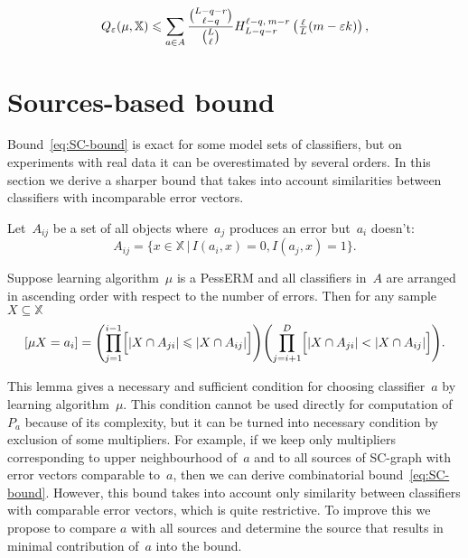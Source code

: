 \documentclass{article}
\def\AA{A}
\def\XX{\mathbb{X}}
\renewcommand{\leq}{\leqslant}
\def\CC_#1^#2{\tbinom{#1}{#2}}
\newcommand{\hypergeom}[5]{{#1}_{#2}^{#4,\:#3}\left(#5\right)}
\newcommand{\Hyper}[4]{\hypergeom{H}{#1}{#2}{#3}{#4}}
\newcommand{\cond}{\mspace{3mu}{|}\mspace{3mu}}
\begin{document}
\begin{equation}
\label{eq:SC-bound}
    Q_\eps(\mu,\XX)
    \leq
    \sum_{a\in A}
        \frac{\CC_{L-q-r}^{\ell-q}}{\CC_{L}^{\ell}}
        \Hyper{L-q-r}{m-r}{\ell-q}{\tfrac\ell L (m - \eps k)},
\end{equation}

\section{Sources-based bound}

Bound~\eqref{eq:SC-bound} is exact for some model sets of classifiers,
but on experiments with real data it can be overestimated by several orders.
In this section we derive a sharper bound that takes into account similarities
between classifiers with incomparable error vectors.

Let~$A_{ij}$ be a set of all objects where~$a_j$ produces an error
but~$a_i$ doesn't:
\[
    A_{ij}
    =
    \{
        x \in \XX
        \cond
        I(a_i, x) = 0,
        I(a_j, x) = 1
    \}.
\]

\begin{lemma}
\label{choise_condition_lemma}
    Suppose learning algorithm~$\mu$ is a PessERM and
    all classifiers in~$\AA$ are arranged in ascending order with respect to the number of errors.
    Then for any sample~$X \subseteq \XX$
    \begin{equation}
    \label{choise_condition}
        \left[ \mu X = a_i \right]
        =
        \Biggl( \prod_{j = 1}^{i - 1} \Bigl[ |X \cap A_{ji}| \leq |X \cap A_{ij}| \Bigr] \Biggr)
        \Biggl( \prod_{j = i + 1}^{D} \Bigl[ |X \cap A_{ji}| < |X \cap A_{ij}| \Bigr] \Biggr).
    \end{equation}
\end{lemma}

This lemma gives a necessary and sufficient condition
for choosing classifier~$a$ by learning algorithm~$\mu$.
This condition cannot be used directly for computation
of~$P_a$ because of its complexity,
but it can be turned into necessary condition by exclusion of some multipliers.
For example, if we keep only multipliers corresponding to upper neighbourhood of~$a$
and to all sources of SC-graph with error vectors comparable to~$a$,
then we can derive combinatorial bound~\eqref{eq:SC-bound}.
However, this bound takes into account only similarity between classifiers with
comparable error vectors, which is quite restrictive.
To improve this we propose to compare $a$ with all sources and determine the source that results in
minimal contribution of~$a$ into the bound.
\end{document}
